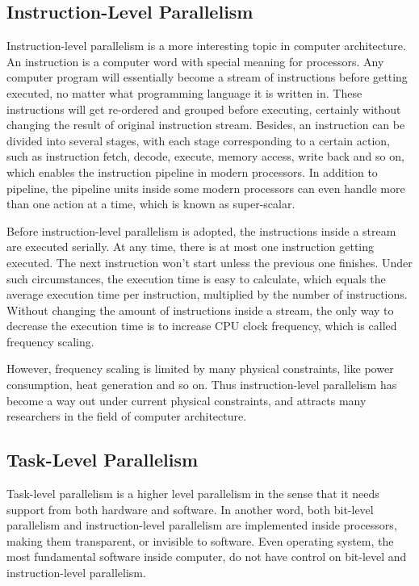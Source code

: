 \documentclass[12pt,a4paper]{report}
\begin{document}
\subsection{Instruction-Level Parallelism}

Instruction-level parallelism is a more interesting topic in computer architecture. An instruction is a computer word with special meaning for processors. Any computer program will essentially become a stream of instructions before getting executed, no matter what programming language it is written in. These instructions will get re-ordered and grouped before executing, certainly without changing the result of original instruction stream. Besides, an instruction can be divided into several stages, with each stage corresponding to a certain action, such as instruction fetch, decode, execute, memory access, write back and so on, which enables the instruction pipeline in modern processors. In addition to pipeline, the pipeline units inside some modern processors can even handle more than one action at a time, which is known as super-scalar.

Before instruction-level parallelism is adopted, the instructions inside a stream are executed serially. At any time, there is at most one instruction getting executed. The next instruction won't start unless the previous one finishes. Under such circumstances, the execution time is easy to calculate, which equals the average execution time per instruction, multiplied by the number of instructions. Without changing the amount of instructions inside a stream, the only way to decrease the execution time is to increase CPU clock frequency, which is called frequency scaling.

However, frequency scaling is limited by many physical constraints, like power consumption, heat generation and so on. Thus instruction-level parallelism has become a way out under current physical constraints, and attracts many researchers in the field of computer architecture.

\subsection{Task-Level Parallelism}

Task-level parallelism is a higher level parallelism in the sense that it needs support from both hardware and software. In another word, both bit-level parallelism and instruction-level parallelism are implemented inside processors, making them transparent, or invisible to software. Even operating system, the most fundamental software inside computer, do not have control on bit-level and instruction-level parallelism. 
\end{document}

